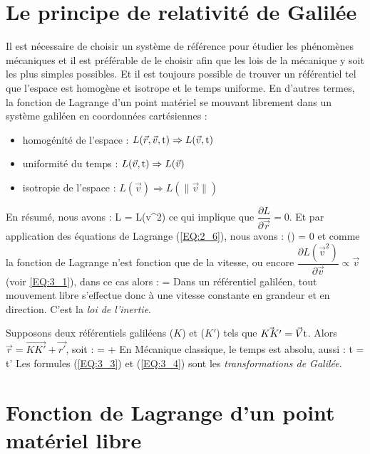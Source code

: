 \section{Le principe de relativit\'e de Galil\'ee}

Il est n\'ecessaire de choisir un syst\`eme de r\'ef\'erence pour \'etudier les ph\'enom\`enes m\'ecaniques et il est pr\'ef\'erable de le choisir afin que les lois de la m\'ecanique y soit les plus simples possibles. Et il est toujours possible de trouver un r\'ef\'erentiel tel que l'espace est homog\`ene et isotrope et le temps uniforme. En d'autres termes, la fonction de Lagrange d'un point mat\'eriel se mouvant librement dans un syst\`eme galil\'een en coordonn\'ees cart\'esiennes :
\begin{itemize}
	\item homog\'en\'it\'e de l'espace : $L(\vec{r},\vec{v},{\rm t}) \Rightarrow L(\vec{v},{\rm t})$
	\item uniformit\'e du temps : $L(\vec{v},{\rm t}) \Rightarrow L(\vec{v})$
	\item isotropie de l'espace : $L(\vec{v}) \Rightarrow L(\lVert\vec{v}\rVert)$
\end{itemize}
En r\'esum\'e, nous avons :
\be
	L = L(v^{2}) \label{EQ:3_1}
\ee
ce qui implique que $\dfrac{\partial L}{\partial \vec{r}} = 0$. Et par application des \'equations de Lagrange (\ref{EQ:2_6}), nous avons :
\be
	\left(\right) = 0
\ee
et comme la fonction de Lagrange n'est fonction que de la vitesse, ou encore $\dfrac{\partial L({\vec{v}}^{2})}{\partial \vec{v}} \propto \vec{v}$ (voir \ref{EQ:3_1}), dans ce cas alors :
\be
	 =  \label{EQ:3_2}
\ee
Dans un r\'ef\'erentiel galil\'een, tout mouvement libre s'effectue donc \`a une vitesse constante en grandeur et en direction. C'est la \emph{loi de l'inertie}.

Supposons deux r\'ef\'erentiels galil\'eens ($K$) et ($K'$) tels que $\vec{KK'}=\vec{V}{\rm t}$. Alors $\vec{r}=\vec{KK'}+\vec{r'}$, soit :
\be
	 =  +  \label{EQ:3_3}
\ee
En M\'ecanique classique, le temps est absolu, aussi :
\be
	{\rm t} = {\rm t'} \label{EQ:3_4}
\ee
Les formules (\ref{EQ:3_3}) et (\ref{EQ:3_4}) sont les \emph{transformations de Galil\'ee}.

\section{Fonction de Lagrange d'un point mat\'eriel libre}